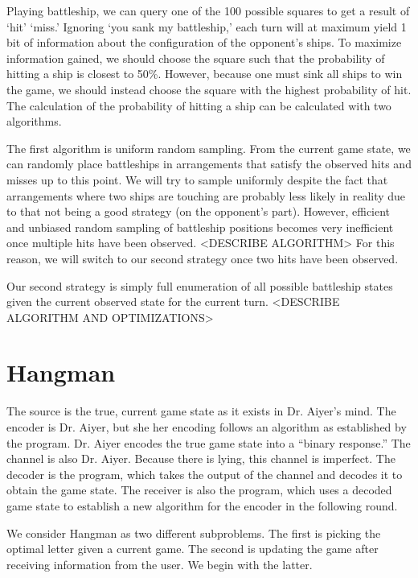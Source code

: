 \documentclass[conference,letterpaper]{IEEEtran}
\begin{document}
    Playing battleship, we can query one of the 100 possible squares to get a result of `hit' `miss.' Ignoring `you sank my battleship,' each turn will at maximum yield 1 bit of information about the configuration of the opponent's ships. To maximize information gained, we should choose the square such that the probability of hitting a ship is closest to 50\%. However, because one must sink all ships to win the game, we should instead choose the square with the highest probability of hit. The calculation of the probability of hitting a ship can be calculated with two algorithms.

    The first algorithm is uniform random sampling. From the current game state, we can randomly place battleships in arrangements that satisfy the observed hits and misses up to this point. We will try to sample uniformly despite the fact that arrangements where two ships are touching are probably less likely in reality due to that not being a good strategy (on the opponent's part). However, efficient and unbiased random sampling of battleship positions becomes very inefficient once multiple hits have been observed. <DESCRIBE ALGORITHM> For this reason, we will switch to our second strategy once two hits have been observed.

    Our second strategy is simply full enumeration of all possible battleship states given the current observed state for the current turn. <DESCRIBE ALGORITHM AND OPTIMIZATIONS>

    \section{Hangman}

    The source is the true, current game state as it exists in Dr. Aiyer's mind.
    The encoder is Dr. Aiyer, but she her encoding follows an algorithm as established by the program. Dr. Aiyer encodes the true game state into a ``binary response.''
    The channel is also Dr. Aiyer. Because there is lying, this channel is imperfect.
    The decoder is the program, which takes the output of the channel and decodes it to obtain the game state.
    The receiver is also the program, which uses a decoded game state to establish a new algorithm for the encoder in the following round.


    We consider Hangman as two different subproblems. The first is picking the optimal letter given a current game. The second is updating the game after receiving information from the user. We begin with the latter.
\end{document}
